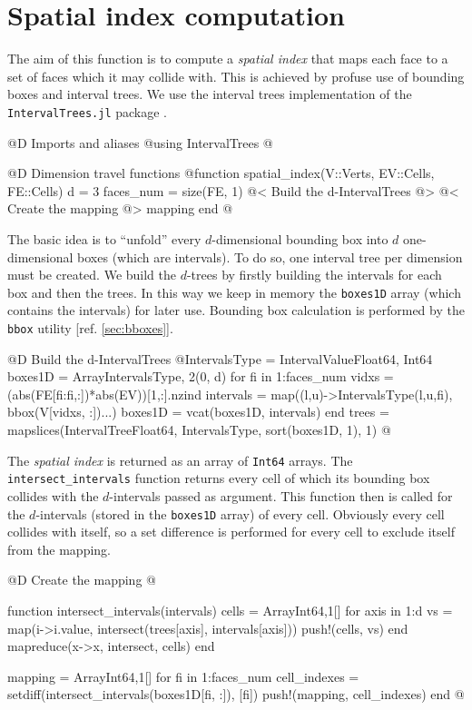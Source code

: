 \section{Spatial index computation}
\label{sec:spatial_index}

The aim of this function is to compute a \textit{spatial index} that maps
each face to a set of faces which it may collide with.
This is achieved by profuse use of bounding boxes and interval trees. 
We use the interval trees implementation of the \texttt{IntervalTrees.jl} package
\cite{IntervalTrees}.

@D Imports and aliases
@{using IntervalTrees
@}

@D Dimension travel functions
@{function spatial_index(V::Verts, EV::Cells, FE::Cells)
    d = 3
    faces_num = size(FE, 1)
    @< Build the d-IntervalTrees @>
    @< Create the mapping @>
    mapping
end
@}

The basic idea is to ``unfold'' every $d$-dimensional bounding box into $d$ one-dimensional boxes
(which are intervals).
To do so, one interval tree per dimension must be created. 
We build the $d$-trees by firstly building the intervals for each box and then the trees.
In this way we keep in memory the \texttt{boxes1D} array (which contains the intervals) for later use.
Bounding box calculation is performed by the \texttt{bbox} utility [ref. \ref{sec:bboxes}].

@D Build the d-IntervalTrees
@{IntervalsType = IntervalValue{Float64, Int64}
boxes1D = Array{IntervalsType, 2}(0, d)
for fi in 1:faces_num
    vidxs = (abs(FE[fi:fi,:])*abs(EV))[1,:].nzind
    intervals = map((l,u)->IntervalsType(l,u,fi), bbox(V[vidxs, :])...)
    boxes1D = vcat(boxes1D, intervals)
end
trees = mapslices(IntervalTree{Float64, IntervalsType}, sort(boxes1D, 1), 1)
@}

The \textit{spatial index} is returned as an array of 
\texttt{Int64} arrays. The \texttt{intersect\_intervals} 
function returns every cell of which its bounding box collides with 
the $d$-intervals passed as argument. This function 
then is called for the $d$-intervals (stored in the 
\texttt{boxes1D} array) of every cell. Obviously every 
cell collides with itself, so a set difference is 
performed for every cell to exclude itself from the mapping.

@D Create the mapping
@{function intersect_intervals(intervals)
    cells = Array{Int64,1}[]
    for axis in 1:d
        vs = map(i->i.value, intersect(trees[axis], intervals[axis]))
        push!(cells, vs)
    end
    mapreduce(x->x, intersect, cells)
end

mapping = Array{Int64,1}[]
for fi in 1:faces_num
    cell_indexes = setdiff(intersect_intervals(boxes1D[fi, :]), [fi])
    push!(mapping, cell_indexes)
end
@}


